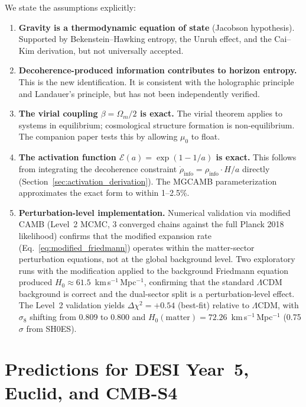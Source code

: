 \documentclass[11pt]{article}
\begin{document}
We state the assumptions explicitly:
\begin{enumerate}
\item \textbf{Gravity is a thermodynamic equation of state}
  (Jacobson hypothesis).  Supported by Bekenstein--Hawking entropy, the
  Unruh effect, and the Cai--Kim derivation, but not universally accepted.

\item \textbf{Decoherence-produced information contributes to horizon
  entropy.}  This is the new identification.  It is consistent with the
  holographic principle~\citep{tHooft1993,Susskind1995} and Landauer's
  principle, but has not been independently verified.

\item \textbf{The virial coupling $\beta = \Omega_m/2$ is exact.}  The
  virial theorem applies to systems in equilibrium; cosmological structure
  formation is non-equilibrium.  The companion paper tests this by allowing
  $\mu_0$ to float.

\item \textbf{The activation function $\mathcal{E}(a) = \exp(1-1/a)$ is
  exact.}  This follows from integrating the decoherence constraint
  $\dot\rho_\mathrm{info} = \rho_\mathrm{info}\cdot H/a$ directly
  (Section~\ref{sec:activation_derivation}).  The MGCAMB parameterization
  approximates the exact form to within 1--2.5\%.

\item \textbf{Perturbation-level implementation.}  Numerical validation via
  modified CAMB (Level~2 MCMC, 3 converged chains against the full Planck
  2018 likelihood) confirms that the modified expansion rate
  (Eq.~\ref{eq:modified_friedmann}) operates within the matter-sector
  perturbation equations, not at the global background level.  Two exploratory
  runs with the modification applied to the background Friedmann equation
  produced $H_0 \approx 61.5$~km\,s$^{-1}$\,Mpc$^{-1}$, confirming that
  the standard $\Lambda$CDM background is correct and the dual-sector split
  is a perturbation-level effect.  The Level~2 validation yields
  $\Delta\chi^2 = +0.54$ (best-fit) relative to $\Lambda$CDM, with
  $\sigma_8$ shifting from 0.809 to 0.800 and
  $H_0(\mathrm{matter}) = 72.26$~km\,s$^{-1}$\,Mpc$^{-1}$
  (0.75$\sigma$ from SH0ES).
\end{enumerate}


\section{Predictions for DESI Year~5, Euclid, and CMB-S4}
\label{sec:predictions}
\end{document}

